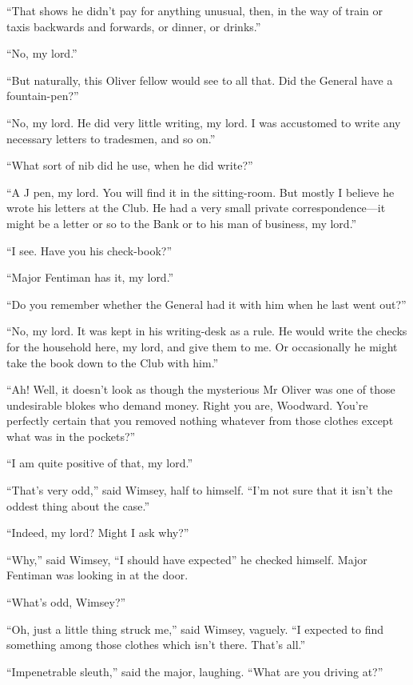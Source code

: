 \enquote{That shows he didn't pay for anything unusual, then, in the way of train or taxis backwards and forwards, or dinner, or drinks.}

\enquote{No, my lord.}

\enquote{But naturally, this Oliver fellow would see to all that. Did the General have a fountain-pen?}

\enquote{No, my lord. He did very little writing, my lord. I was accustomed to write any necessary letters to tradesmen, and so on.}

\enquote{What sort of nib did he use, when he did write?}

\enquote{A J pen, my lord. You will find it in the sitting-room. But mostly I believe he wrote his letters at the Club. He had a very small private correspondence\allowbreak---\allowbreak it might be a letter or so to the Bank or to his man of business, my lord.}

\enquote{I see. Have you his check-book?}

\enquote{Major Fentiman has it, my lord.}

\enquote{Do you remember whether the General had it with him when he last went out?}

\enquote{No, my lord. It was kept in his writing-desk as a rule. He would write the checks for the household here, my lord, and give them to me. Or occasionally he might take the book down to the Club with him.}

\enquote{Ah! Well, it doesn't look as though the mysterious Mr Oliver was one of those undesirable blokes who demand money. Right you are, Woodward. You're perfectly certain that you removed nothing whatever from those clothes except what was in the pockets?}

\enquote{I am quite positive of that, my lord.}

\enquote{That's very odd,} said Wimsey, half to himself. \enquote{I'm not sure that it isn't the oddest thing about the case.}

\enquote{Indeed, my lord? Might I ask why?}

\enquote{Why,} said Wimsey, \enquote{I should have expected\longdash} he checked himself. Major Fentiman was looking in at the door.

\enquote{What's odd, Wimsey?}

\enquote{Oh, just a little thing struck me,} said Wimsey, vaguely. \enquote{I expected to find something among those clothes which isn't there. That's all.}

\enquote{Impenetrable sleuth,} said the major, laughing. \enquote{What are you driving at?}

